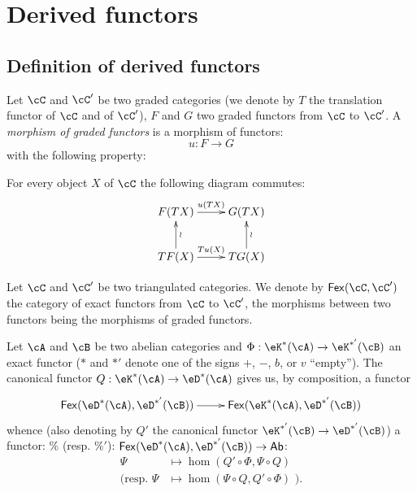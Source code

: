 \section{Derived functors}\label{VIII:4}










\subsection{Definition of derived functors}\label{VIII:4-1}





\begin{definition}\label{VIII:4-1-1}
Let $\cC$ and $\cC'$ be two graded categories (we denote by $T$ the
translation functor of $\cC$ and of $\cC'$), $F$ and $G$ two graded
functors from $\cC$ to $\cC'$. A \emph{morphism of graded functors} is
a morphism of functors:
\[
  u:F\to G
\]
with the following property:

For every object $X$ of $\cC$ the following diagram commutes: 
\[\xymatrix{
  F(T X) \ar[r]^-{u(T X)} 
    & G(T X) \\
  T F(X) \ar[r]^-{T u(X)} \ar[u]_-\wr 
    & T G(X) \ar[u]_-\wr 
}\]
\end{definition}

Let $\cC$ and $\cC'$ be two triangulated categories. We denote by
$\mathsf{Fex}(\cC,\cC')$ the category of exact functors from $\cC$ to
$\cC'$, the morphisms between two functors being the morphisms of graded
functors.

Let $\cA$ and $\cB$ be two abelian categories and
$\Phi:\eK^\ast(\cA)\to \eK^{\ast'}(\cB)$ an exact functor ($\ast$ and $\ast'$
denote one of the signs $+$, $-$, $b$, or $v$ ``empty''). The canonical
functor $Q:\eK^\ast(\cA)\to \eD^\ast(\cA)$ gives us, by composition, a
functor
\[\xymatrix{
  \mathsf{Fex}(\eD^\ast(\cA),\eD^{\ast'}(\cB)) \ar[r]
    & \mathsf{Fex}(\eK^\ast(\cA),\eD^{\ast'}(\cB))
}\]
whence (also denoting by $Q'$ the canonical functor
$\eK^{\ast'}(\cB) \to \eD^{\ast'}(\cB)$) a functor:
$\%$ (resp. $\%'$):
$\mathsf{Fex}(\eD^\ast(\cA),\eD^{\ast'}(\cB)) \to \mathsf{Ab}$: 
\begin{align*}
  \Psi  &\mapsto \hom(Q'\circ \Phi,\Psi\circ Q) \\
  (\text{resp. }\Psi &\mapsto \hom(\Psi\circ Q,Q'\circ \Phi)\text{ ).} 
\end{align*}





